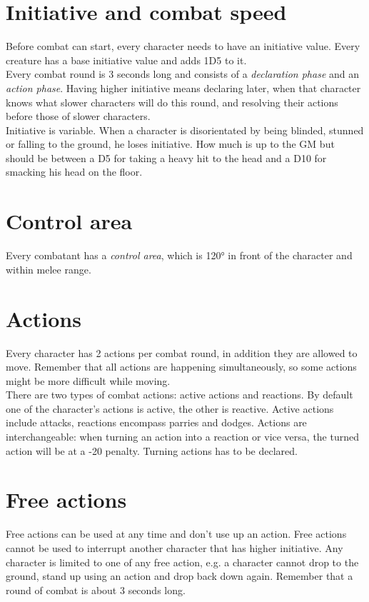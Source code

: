 \section{Initiative and combat speed}
Before combat can start, every character needs to have an initiative value. Every creature has a base initiative value and adds 1D5 to it.\\
Every combat round is 3 seconds long and consists of a \textit{declaration phase} and an \textit{action phase}. Having higher initiative means declaring later, when that character knows what slower characters will do this round, and resolving their actions before those of slower characters.\\
Initiative is variable. When a character is disorientated by being blinded, stunned or falling to the ground, he loses initiative. How much is up to the GM but should be between a D5 for taking a heavy hit to the head and a D10 for smacking his head on the floor.
\section{Control area}
Every combatant has a \emph{control area}, which is 120° in front of the character and within melee range. 
\section{Actions}
Every character has 2 actions per combat round, in addition they are allowed to move. Remember that all actions are happening simultaneously, so some actions might be more difficult while moving.\\
There are two types of combat actions: active actions and reactions. By default one of the character’s actions is active, the other is reactive. Active actions include attacks, reactions encompass parries and dodges. Actions are interchangeable: when turning an action into a reaction or vice versa, the turned action will be at a -20 penalty. Turning actions has to be declared.
\section{Free actions}
Free actions can be used at any time and don't use up an action. Free actions cannot be used to interrupt another character that has higher initiative. Any character is limited to one of any free action, e.g. a character cannot drop to the ground, stand up using an action and drop back down again. Remember that a round of combat is about 3 seconds long.
